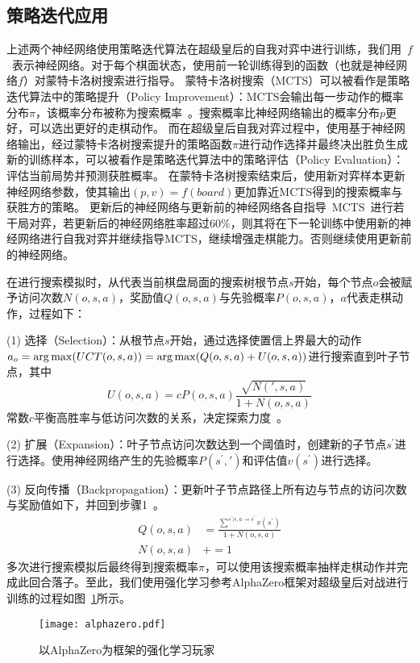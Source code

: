 \subsection{策略迭代应用}
上述两个神经网络使用策略迭代算法在超级皇后的自我对弈中进行训练，我们用~$f$~表示神经网络。对于每个棋面状态，使用前一轮训练得到的函数（也就是神经网络$f$）对蒙特卡洛树搜索进行指导。
蒙特卡洛树搜索（MCTS）可以被看作是策略迭代算法中的策略提升（Policy Improvement）：MCTS会输出每一步动作的概率分布$\pi$，该概率分布被称为搜索概率~\cite{silver2009reinforcement}。搜索概率比神经网络输出的概率分布$p$更好，可以选出更好的走棋动作。
而在超级皇后自我对弈过程中，使用基于神经网络输出，经过蒙特卡洛树搜索提升的策略函数$\pi$进行动作选择并最终决出胜负生成新的训练样本，可以被看作是策略迭代算法中的策略评估（Policy Evaluation）：评估当前局势并预测获胜概率。
在蒙特卡洛树搜索结束后，使用新对弈样本更新神经网络参数，使其输出$(p,v)=f(board)$更加靠近MCTS得到的搜索概率与获胜方的策略。
更新后的神经网络与更新前的神经网络各自指导~MCTS~进行若干局对弈，若更新后的神经网络胜率超过$60\%$，则其将在下一轮训练中使用新的神经网络进行自我对弈并继续指导MCTS，继续增强走棋能力。否则继续使用更新前的神经网络。

在进行搜索模拟时，从代表当前棋盘局面的搜索树根节点$s$开始，每个节点$o$会被赋予访问次数$N(o,s,a)$，奖励值$Q(o,s,a)$与先验概率$P(o,s,a)$，$a$代表走棋动作，过程如下：

(1) 选择（Selection）：从根节点$s$开始，通过选择使置信上界最大的动作$a_{o} =  \mathop{\operatorname*{\arg\max}}(UCT(o,s,a)) =  \mathop{\operatorname*{\arg\max}}(Q(o,s,a) + U(o,s,a))$进行搜索直到叶子节点，其中
\begin{equation}
    U(o,s,a) = cP(o,s,a)\frac{\sqrt{N(\prime,s,a)}}{1+N(o,s,a)}
\end{equation}
常数$c$平衡高胜率与低访问次数的关系，决定探索力度~\cite{rosin2011multi}。

(2) 扩展（Expansion）：叶子节点访问次数达到一个阈值时，创建新的子节点$s^{\prime}$进行选择。使用神经网络产生的先验概率$P(s^{\prime},\prime)$和评估值$v(s^{\prime})$进行选择。

(3) 反向传播（Backpropagation）：更新叶子节点路径上所有边与节点的访问次数与奖励值如下，并回到步骤1~\cite{segal2010scalability}。
\begin{equation}
    \begin{aligned}
    Q(o,s,a) &= \frac{\sum^{s^{\prime}|s,a\rightarrow s^{\prime}}v(s^{\prime})}{1+N(o,s,a)} \\
    N(o,s,a) &+= 1 
    \end{aligned}
\end{equation}
多次进行搜索模拟后最终得到搜索概率$\pi$，可以使用该搜索概率抽样走棋动作并完成此回合落子。至此，我们使用强化学习参考AlphaZero框架对超级皇后对战进行训练的过程如图~\ref{fig:az}所示。
\begin{figure}[!tb]
    \centering
    \texttt{[image: alphazero.pdf]}
    \caption[az]{%
    以AlphaZero为框架的强化学习玩家~\cite{Silver2017}%
      }
    \label{fig:az}
\end{figure}


